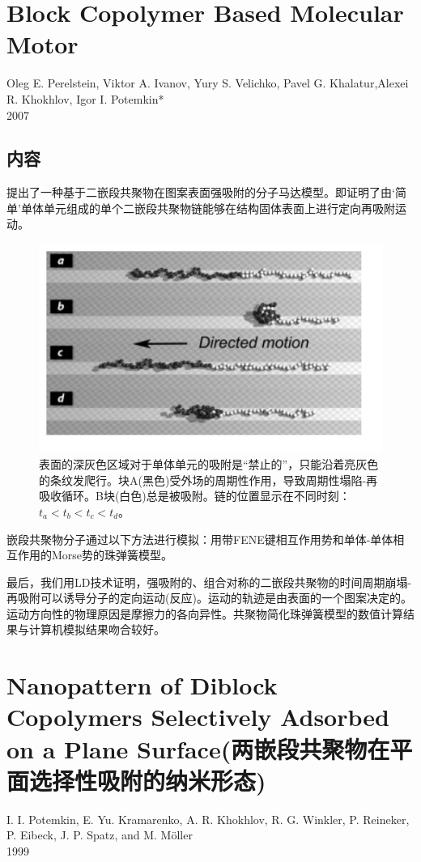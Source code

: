 \documentclass[12pt,a4paper]{article}
\numberwithin{equation}{section}
\begin{document}
\section{Block Copolymer Based Molecular Motor}
\begin{center}
Oleg E. Perelstein, Viktor A. Ivanov, Yury S. Velichko, Pavel G. Khalatur,Alexei R. Khokhlov, Igor I. Potemkin*\\
2007
\end{center}
\subsection{内容}
提出了一种基于二嵌段共聚物在图案表面强吸附的分子马达模型。即证明了由‘简单’单体单元组成的单个二嵌段共聚物链能够在结构固体表面上进行定向再吸附运动。
\begin{figure}[H]
\centering
\includegraphics[scale=0.5]{./figures/5.png}
\caption{表面的深灰色区域对于单体单元的吸附是“禁止的”，只能沿着亮灰色的条纹发爬行。块A(黑色)受外场的周期性作用，导致周期性塌陷-再吸收循环。B块(白色)总是被吸附。链的位置显示在不同时刻：$t_a<t_b<t_c<t_d$。}
\end{figure}
嵌段共聚物分子通过以下方法进行模拟：用带FENE键相互作用势和单体-单体相互作用的Morse势的珠弹簧模型。

最后，我们用LD技术证明，强吸附的、组合对称的二嵌段共聚物的时间周期崩塌-再吸附可以诱导分子的定向运动(反应)。运动的轨迹是由表面的一个图案决定的。运动方向性的物理原因是摩擦力的各向异性。共聚物简化珠弹簧模型的数值计算结果与计算机模拟结果吻合较好。


\section{Nanopattern of Diblock Copolymers Selectively Adsorbed on a Plane Surface(两嵌段共聚物在平面选择性吸附的纳米形态)}
\begin{center}
I. I. Potemkin, E. Yu. Kramarenko,  A. R. Khokhlov,  R. G. Winkler, P. Reineker, P. Eibeck, J. P. Spatz, and M. Möller \\
1999
\end{center}
\end{document}
